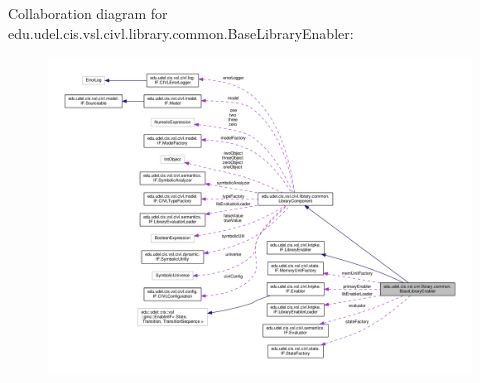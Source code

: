 Collaboration diagram for edu.\+udel.\+cis.\+vsl.\+civl.\+library.\+common.\+Base\+Library\+Enabler\+:
\nopagebreak
\begin{figure}[H]
\begin{center}
\leavevmode
\includegraphics[width=350pt]{classedu_1_1udel_1_1cis_1_1vsl_1_1civl_1_1library_1_1common_1_1BaseLibraryEnabler__coll__graph}
\end{center}
\end{figure}
